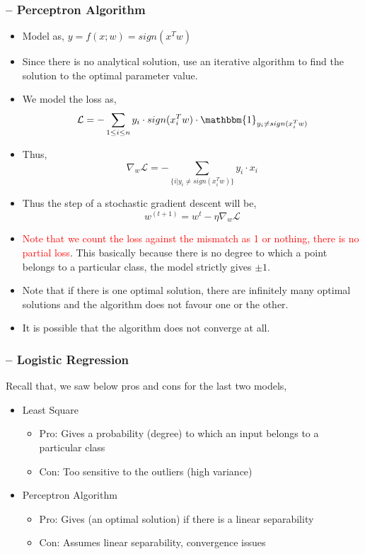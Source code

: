 \documentclass{article}
\newcommand{\red}[1]{\textcolor{red}{#1}}
\begin{document}
\subsubsection{-- Perceptron Algorithm}
\begin{itemize}
    \item Model as, $y = f(x;w) = sign(x^Tw)$
    \item Since there is no analytical solution, use an iterative algorithm to find the solution to the optimal parameter value.
    \item We model the loss as, $$\mathcal{L} = -\sum_{1 \leq i \leq n}{ y_i\cdot sign(x_i^Tw)}\cdot \mathbbm{1}_{y_i \neq sign(x_i^Tw)}$$
    \item Thus, $$\nabla_w{\mathcal{L}} = -\sum_{\{i | {y_i \neq sign(x_i^Tw)}\}}{ y_i\cdot x_i}$$
    \item Thus the step of a stochastic gradient descent will be, $$w^{(t+1)} = w^t - \eta\nabla_w{\mathcal{L}}$$
    \item \red{Note that we count the loss against the mismatch as 1 or nothing, there is no partial loss}. This basically because there is no degree to which a point belongs to a particular class, the model strictly gives $\pm1$.
    \item Note that if there is one optimal solution, there are infinitely many optimal solutions and the algorithm does not favour one or the other.
    \item It is possible that the algorithm does not converge at all.
\end{itemize}

\subsubsection{-- Logistic Regression}
Recall that, we saw below pros and cons for the last two models,
\begin{itemize}
    \item Least Square
        \begin{itemize}
            \item Pro: Gives a probability (degree) to which an input belongs to a particular class
            \item Con: Too sensitive to the outliers (high variance)
        \end{itemize}
    \item Perceptron Algorithm
        \begin{itemize}
            \item Pro: Gives (an optimal solution) if there is a linear separability
            \item Con: Assumes linear separability, convergence issues
        \end{itemize}
\end{itemize}
\end{document}
